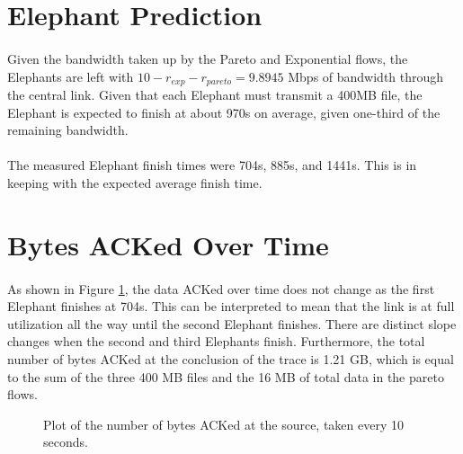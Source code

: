 \documentclass{article}
\begin{document}
\section{Elephant Prediction}

\paragraph{}
Given the bandwidth taken up by the Pareto and Exponential flows, the Elephants are left with $10 - r_{exp} - r_{pareto} = 9.8945$ Mbps of bandwidth through the central link.
Given that each Elephant must transmit a 400MB file, the Elephant is expected to finish at about 970s on average, given one-third of the remaining bandwidth.

\paragraph{}
The measured Elephant finish times were 704s, 885s, and 1441s. This is in keeping with the expected average finish time.

\section{Bytes ACKed Over Time}
\paragraph{}
As shown in Figure \ref{fig:ack_plot}, the data ACKed over time does not change as the first Elephant finishes at 704s.
This can be interpreted to mean that the link is at full utilization all the way until the second Elephant finishes.
There are distinct slope changes when the second and third Elephants finish.
Furthermore, the total number of bytes ACKed at the conclusion of the trace is 1.21 GB, which is equal to the sum of the three 400 MB files and the 16 MB of total data in the pareto flows.

\begin{figure}[h]
  \begin{centering}
    
    \caption{Plot of the number of bytes ACKed at the source, taken every 10 seconds.}
    \label{fig:ack_plot}
  \end{centering}
\end{figure}
\end{document}
